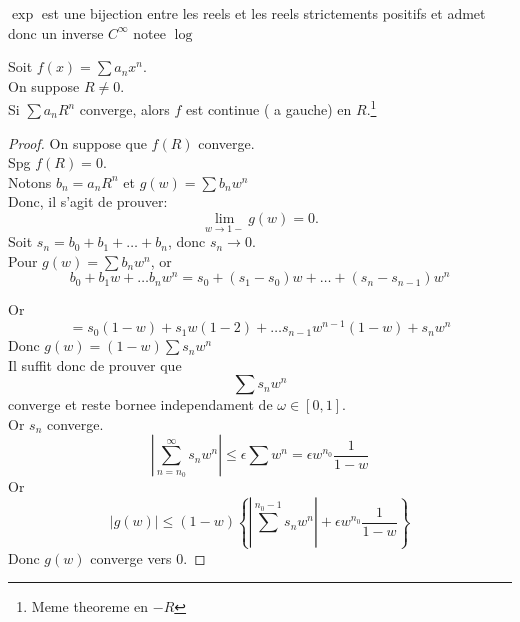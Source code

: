 \documentclass[../main.tex]{subfiles}
\begin{document}
\begin{crly}
$\exp$ est une bijection entre les reels et les reels strictements positifs et admet donc un inverse $C^{ \infty }$ notee $\log$
\end{crly}
\begin{thm}
	Soit $f( x) = \sum a_n x^{n}$.\\
	On suppose $R \neq 0$.\\
	Si $\sum a_n R^{n}$ converge, alors $f$ est continue ( a gauche) en $R$.\footnote{Meme theoreme en $-R$ }\\
\end{thm}
\begin{proof}
	On suppose que $f( R) $ converge.\\
	Spg $f( R) = 0$.\\
	Notons $b_n = a_n R^{n}$ et $g( w) = \sum b_n w^{n}$ \\
	Donc, il s'agit de prouver:
	\[ 
		\lim_{w \to 1-} g( w) = 0.
	\]
	Soit $s_n= b_0+ b_1 + \ldots + b_n$, donc $s_n \to 0$.\\
	Pour $g( w) = \sum b_n w^{n}$, or 
	\[ 
		b_0 + b_1 w + \ldots b_n w^{n}= s_0 + ( s_1-s_0) w + \ldots + ( s_n - s_{n-1} ) w^{n}
	\]

Or
\[ 
	= s_0 ( 1- w)  + s_1 w ( 1-2)  + \ldots s_{n-1} w^{n-1  }( 1-w) + s_n w^{n}
\]
Donc $g( w) = ( 1-w) \sum s_n w^{n} $\\
Il suffit donc de prouver que 
\[ 
\sum s_n w^{n}
\]
converge et reste bornee independament de $\omega \in [ 0,1] $.\\
Or $s_n$ converge.
\[ 
	| \sum_{n=n_0} ^{ \infty } s_n w^{n}| \leq \epsilon \sum w^{n} = \epsilon w^{n_0} \frac{1}{1-w}
\]
Or 
\[ 
	|g( w) | \leq ( 1-w)  \left\{ | \sum^{n_0-1} s_n w^{n}  | + \epsilon w^{n_0} \frac{1}{1-w}\right\}
\]
Donc $g( w) $ converge vers 0.


\end{proof}
\end{document}
